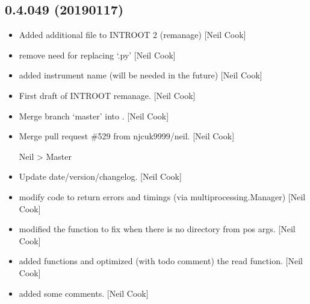 \documentclass[a4paper,10pt,english]{report}
\begin{document}
\subsection{0.4.049 (2019\sphinxhyphen{}01\sphinxhyphen{}17)}
\label{\detokenize{misc/changelog:id234}}\begin{itemize}
\item {} 
Added additional file to INTROOT 2 (remanage) {[}Neil Cook{]}

\item {} 
 \sphinxhyphen{} remove need for replacing ‘.py’ {[}Neil Cook{]}

\item {} 
 \sphinxhyphen{} added instrument name (will be needed in the
future) {[}Neil Cook{]}

\item {} 
First draft of INTROOT remanage. {[}Neil Cook{]}

\item {} 
Merge branch ‘master’ into . {[}Neil Cook{]}

\item {} 
Merge pull request \#529 from njcuk9999/neil. {[}Neil Cook{]}

Neil \textendash{}\textgreater{} Master

\item {} 
Update date/version/changelog. {[}Neil Cook{]}

\item {} 
 \sphinxhyphen{} modify code to return errors and timings (via
multiprocessing.Manager) {[}Neil Cook{]}

\item {} 
 \sphinxhyphen{} modified the  function to
fix when there is no directory from pos args. {[}Neil Cook{]}

\item {} 
 \sphinxhyphen{} added  functions and optimized
(with todo comment) the read function. {[}Neil Cook{]}

\item {} 
 \sphinxhyphen{} added some comments. {[}Neil Cook{]}

\end{itemize}
\end{document}
